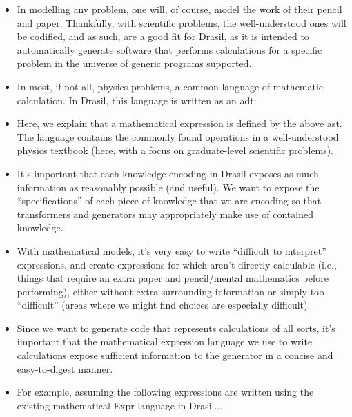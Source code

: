 \begin{itemize}

	\item In modelling any problem, one will, of course, model the work of their
		  pencil and paper. Thankfully, with scientific problems, the
		  well-understood ones will be codified\cite{well-understood}, and as
		  such, are a good fit for Drasil, as it is intended to automatically
		  generate software that performs calculations for a specific problem in
		  the universe of generic programs supported.

	\item In most, if not all, physics problems, a common language of mathematic
	      calculation. In Drasil, this language is written as an \acf{adt}: 
		  
		  \currentExprHaskell

	\item Here, we explain that a mathematical expression is defined by the
	      above \acf{ast}. The language contains the commonly found operations
	      in a well-understood physics textbook (here, with a focus on
	      graduate-level scientific problems).

	\item It's important that each knowledge encoding in Drasil exposes as much
	      information as reasonably possible (and useful).  We want to expose the ``specifications'' of each piece of
	      knowledge that we are encoding so that transformers and generators may
	      appropriately make use of contained knowledge.

	\item With mathematical models, it's very easy to write ``difficult to
	      interpret'' expressions, and create expressions for which aren't
	      directly calculable (i.e., things that require an extra paper and
	      pencil/mental mathematics before performing), either without extra
	      surrounding information or simply too ``difficult'' (areas where we
	      might find choices are especially difficult).

	\item Since we want to generate code that represents calculations of all
	      sorts, it's important that the mathematical expression language we use
	      to write calculations expose sufficient information to the generator
	      in a concise and easy-to-digest manner.

	\item For example, assuming the following expressions are written using the
	      existing mathematical Expr language in Drasil...
	      \begin{itemize}


\end{itemize}
\end{itemize}
